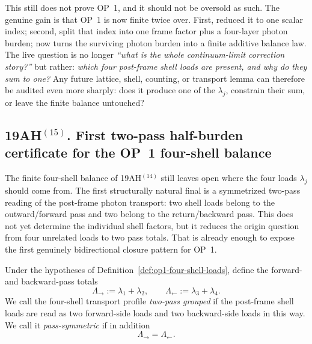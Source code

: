 \begin{remark}
This still does not prove OP~1, and it should not be oversold as such. The genuine gain is that OP~1 is now finite twice over. First, reduced it to one scalar index; second, split that index into one frame factor plus a four-layer photon burden; now turns the surviving photon burden into a finite additive balance law. The live question is no longer \emph{``what is the whole continuum-limit correction story?''} but rather: \emph{which four post-frame shell loads are present, and why do they sum to one?} Any future lattice, shell, counting, or transport lemma can therefore be audited even more sharply: does it produce one of the \(\lambda_j\), constrain their sum, or leave the finite balance untouched?
\end{remark}

\subsection*{19AH$^{(15)}$. First two-pass half-burden certificate for the OP~1 four-shell balance}
The finite four-shell balance of 19AH$^{(14)}$ still leaves open where the four loads \(\lambda_j\) should come from. The first structurally natural final is a symmetrized two-pass reading of the post-frame photon transport: two shell loads belong to the outward/forward pass and two belong to the return/backward pass. This does not yet determine the individual shell factors, but it reduces the origin question from four unrelated loads to two pass totals. That is already enough to expose the first genuinely bidirectional closure pattern for OP~1.

\begin{definition}
\label{def:op1-two-pass-loads}
Under the hypotheses of Definition~\ref{def:op1-four-shell-loads}, define the forward- and backward-pass totals
\[
 \Lambda_{\rightarrow} := \lambda_1+\lambda_2,
 \qquad
 \Lambda_{\leftarrow} := \lambda_3+\lambda_4.
\]
We call the four-shell transport profile \emph{two-pass grouped} if the post-frame shell loads are read as two forward-side loads and two backward-side loads in this way. We call it \emph{pass-symmetric} if in addition
\[
 \Lambda_{\rightarrow}=\Lambda_{\leftarrow}.
\]
\end{definition}

